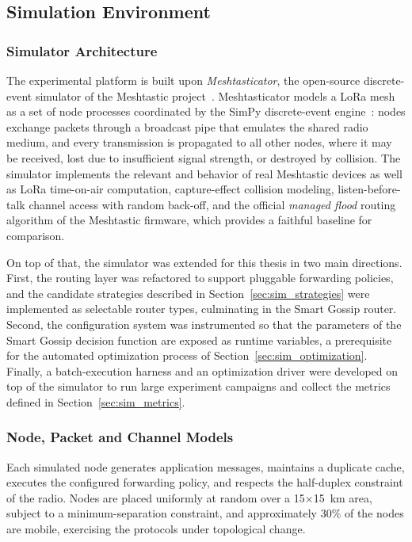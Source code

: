\documentclass[english,bachelor]{tfgitic}[2026/01/22]
\begin{document}
\subsection{Simulation Environment}

\subsubsection{Simulator Architecture}
The experimental platform is built upon \emph{Meshtasticator}, the open-source discrete-event simulator of the Meshtastic project~\cite{meshtasticator2024}. Meshtasticator models a LoRa mesh as a set of node processes coordinated by the SimPy discrete-event engine~\cite{simpy2024}: nodes exchange packets through a broadcast pipe that emulates the shared radio medium, and every transmission is propagated to all other nodes, where it may be received, lost due to insufficient signal strength, or destroyed by collision. The simulator implements the relevant  and  behavior of real Meshtastic devices as well as LoRa time-on-air computation, capture-effect collision modeling, listen-before-talk channel access with random back-off, and the official \emph{managed flood} routing algorithm of the Meshtastic firmware, which provides a faithful baseline for comparison.

On top of that, the simulator was extended for this thesis in two main directions. First, the routing layer was refactored to support pluggable forwarding policies, and the candidate strategies described in Section~\ref{sec:sim_strategies} were implemented as selectable router types, culminating in the Smart Gossip router. Second, the configuration system was instrumented so that the parameters of the Smart Gossip decision function are exposed as runtime variables, a prerequisite for the automated optimization process of Section~\ref{sec:sim_optimization}. Finally, a batch-execution harness and an optimization driver were developed on top of the simulator to run large experiment campaigns and collect the metrics defined in Section~\ref{sec:sim_metrics}.

\subsubsection{Node, Packet and Channel Models}
Each simulated node generates application messages, maintains a duplicate cache, executes the configured forwarding policy, and respects the half-duplex constraint of the radio. Nodes are placed uniformly at random over a 15$\times$15~km area, subject to a minimum-separation constraint, and approximately 30\% of the nodes are mobile, exercising the protocols under topological change.
\end{document}
